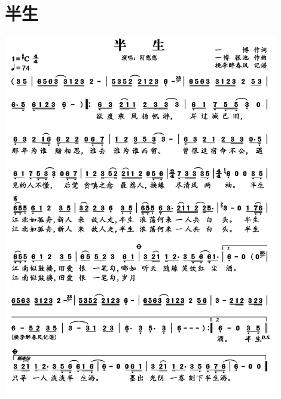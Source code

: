 \documentclass[cn,pad,twocol]{elegantbook}
\begin{document}
\section{半生} \includegraphics[width=0.9\textwidth]{rpi400/20210212半生.png}
\end{document}
